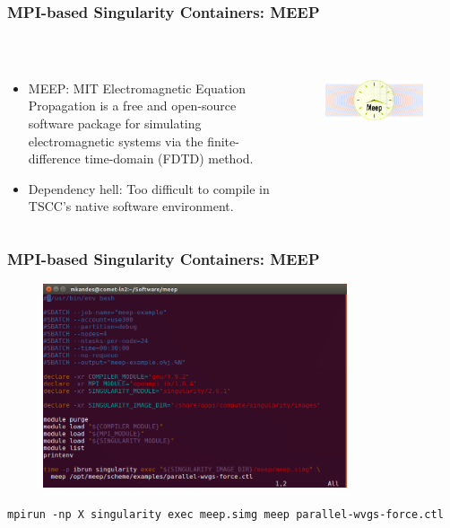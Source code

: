 \documentclass{beamer}
\begin{document}
\begin{frame}
   \frametitle{MPI-based Singularity Containers: MEEP}
   \begin{columns}
      \begin{column}{0.6\textwidth}
         \begin{itemize}
            \setlength\itemsep{1.0em}
            \item MEEP: MIT Electromagnetic Equation Propagation is a 
               free and open-source software package for simulating 
               electromagnetic systems via the finite-difference 
               time-domain (FDTD) method.
            \item Dependency hell: Too difficult to compile in TSCC's 
               native software environment.
         \end{itemize}
      \end{column}
      \hfill
      \begin{column}{0.5\textwidth}
         \begin{figure}[htbp]
            \includegraphics[width=1.0\textwidth]{images/meep-logo.png}
         \end{figure}
      \end{column}
   \end{columns}
\end{frame}

\begin{frame}
   \frametitle{MPI-based Singularity Containers: MEEP}
   \begin{figure}[htbp]
      \includegraphics[width=0.8\textwidth]{images/meep-singularity-mpi-example-batch-job.png}
   \end{figure}
   \lstinline{mpirun -np X singularity exec meep.simg meep parallel-wvgs-force.ctl}
\end{frame}
\end{document}
